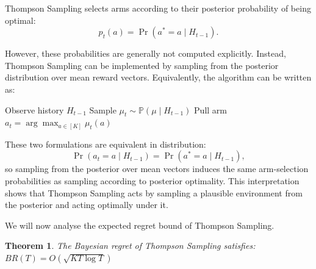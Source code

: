 \documentclass[12pt]{article}
\newtheorem{theorem}{Theorem}[section]
\begin{document}
Thompson Sampling selects arms according to their posterior probability of being optimal:
\[
p_t(a) = \Pr(a^* = a \mid H_{t-1}).
\]

\noindent However, these probabilities are generally not computed explicitly. Instead, Thompson Sampling can be implemented by sampling from the posterior distribution over mean reward vectors. Equivalently, the algorithm can be written as:

\begin{algorithm}[H]
\caption{Thompson Sampling (posterior sampling form)}
\begin{algorithmic}[1]
    \STATE Observe history $H_{t-1}$
    \STATE Sample $\mu_t \sim \mathbb{P}(\mu \mid H_{t-1})$
    \STATE Pull arm $a_t = \arg\max_{a \in [K]} \mu_t(a)$
\ENDFOR
\end{algorithmic}
\end{algorithm}

\noindent These two formulations are equivalent in distribution:
\[
\Pr(a_t = a \mid H_{t-1}) = \Pr(a^* = a \mid H_{t-1}),
\]
so sampling from the posterior over mean vectors induces the same arm-selection probabilities as sampling according to posterior optimality.
This interpretation shows that Thompson Sampling acts by sampling a plausible environment from the posterior and acting optimally under it.

\vspace{5mm}

\noindent We will now analyse the expected regret bound of Thompson Sampling. 
\begin{theorem}
The Bayesian regret of Thompson Sampling satisfies: $BR(T) = O\!\left(\sqrt{KT \log T}\right)$
\end{theorem}
\end{document}
